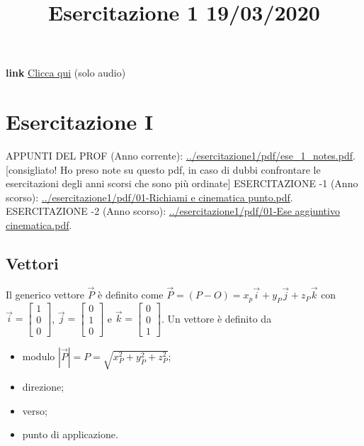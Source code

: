 \title{Esercitazione 1 19/03/2020}\newline
\textbf{link} \href{https://web.microsoftstream.com/video/4f8d8d0e-8354-4151-bbc2-efa8e7399119?list=user&userId=c487c446-28dc-44c3-b1fb-2fe7e71e0737}{Clicca qui} (solo audio)
\section{Esercitazione I}
APPUNTI DEL PROF (Anno corrente): \url{../esercitazione1/pdf/ese_1_notes.pdf}. [consigliato! Ho preso note su questo pdf, in caso di dubbi confrontare le esercitazioni degli anni scorsi che sono più ordinate]\newline
\newline
ESERCITAZIONE -1 (Anno scorso): \url{../esercitazione1/pdf/01-Richiami e cinematica punto.pdf}.\newline
\newline
ESERCITAZIONE -2 (Anno scorso): \url{../esercitazione1/pdf/01-Ese aggiuntivo cinematica.pdf}.
\subsection{Vettori}
Il generico vettore $\vec{P}$ è definito come $\vec{P} = (P-O) = x_p \vec{i} + y_P \vec{j} + z_P \vec{k}$ con $\vec{i} = \left[\begin{matrix}
    1\\0\\0
\end{matrix}\right]$, $\vec{j} = \left[\begin{matrix}
    0\\1\\0
\end{matrix}\right]$ e $\vec{k}= \left[\begin{matrix}
    0\\0\\1
\end{matrix}\right]$.\newline
\newline
Un vettore è definito da 
\begin{itemize}
    \item modulo $|\vec{P}| = P = \sqrt{x_P^2 + y_P^2 + z_P^2}$;
    \item direzione;
    \item verso;
    \item punto di applicazione.
\end{itemize}
